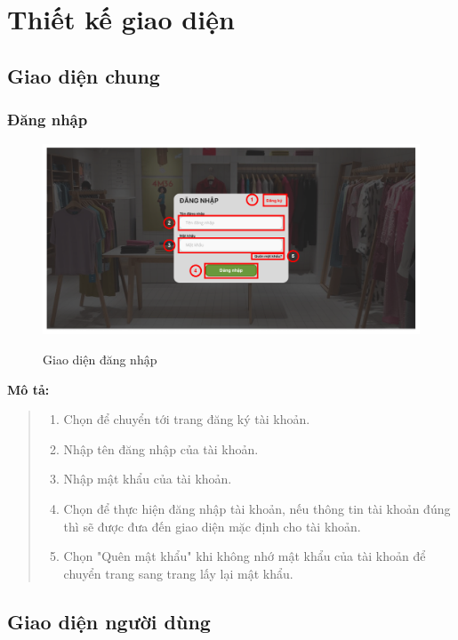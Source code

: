\section{Thiết kế giao diện}

\subsection{Giao diện chung}
    \subsubsection{Đăng nhập}
    \begin{figure}[!htp]
        \centering
        \includegraphics[width=5in]{img/UI/customer/login.png}
        \label{1}
        \newline
        \caption{Giao diện đăng nhập}
    \end{figure}
    \textbf{Mô tả:} 
    \begin{quote}
        \begin{enumerate}
            \item Chọn để chuyển tới trang đăng ký tài khoản.
            \item Nhập tên đăng nhập của tài khoản.
            \item Nhập mật khẩu của tài khoản.
            \item Chọn để thực hiện đăng nhập tài khoản, nếu thông tin tài khoản đúng thì sẽ được đưa đến giao diện mặc định cho tài khoản.
            \item Chọn "Quên mật khẩu" khi không nhớ mật khẩu của tài khoản để chuyển trang sang trang lấy lại mật khẩu.
        \end{enumerate}        
    \end{quote}

\subsection{Giao diện người dùng}
